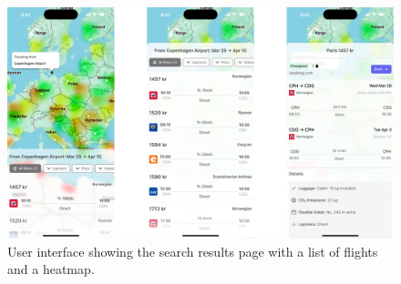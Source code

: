 \begin{figure}[h]
    \includegraphics[width=.89\textwidth]{resources/mockup2.png}
    \caption{User interface showing the search results page with a list of flights and a heatmap.}
    \label{fig:mockup2}
\end{figure}

\newpage


\newpage
